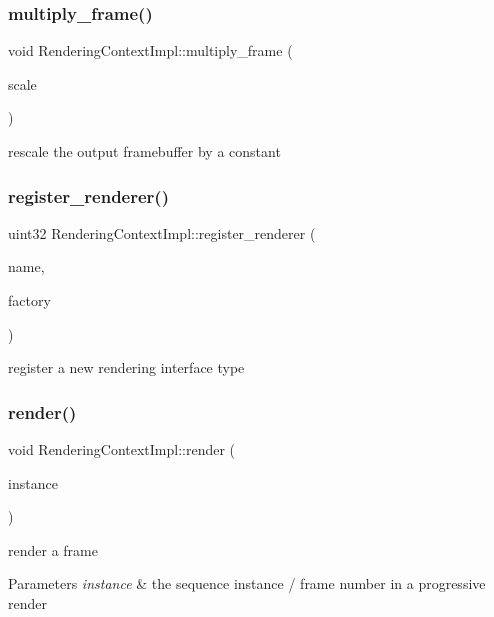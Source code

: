 \subsubsection{\texorpdfstring{multiply\+\_\+frame()}{multiply\_frame()}}
{\footnotesize\ttfamily void Rendering\+Context\+Impl\+::multiply\+\_\+frame (\begin{DoxyParamCaption}\item[{const float}]{scale }\end{DoxyParamCaption})}

rescale the output framebuffer by a constant \mbox{\label{struct_rendering_context_impl_ad709ac4ebdc451032743aef6be0f99d6}} 
\subsubsection{\texorpdfstring{register\+\_\+renderer()}{register\_renderer()}}
{\footnotesize\ttfamily uint32 Rendering\+Context\+Impl\+::register\+\_\+renderer (\begin{DoxyParamCaption}\item[{const char $\ast$}]{name,  }\item[{Renderer\+Factory\+Function}]{factory }\end{DoxyParamCaption})}

register a new rendering interface type \mbox{\label{struct_rendering_context_impl_aaf8b4f561e0beee260fbccddece3d96d}} 
\subsubsection{\texorpdfstring{render()}{render()}}
{\footnotesize\ttfamily void Rendering\+Context\+Impl\+::render (\begin{DoxyParamCaption}\item[{const uint32}]{instance }\end{DoxyParamCaption})}

render a frame


\begin{DoxyParams}{Parameters}
{\em instance} & the sequence instance / frame number in a progressive render \\
\hline
\end{DoxyParams}
\mbox{\label{struct_rendering_context_impl_a6481f4a2884fda739feecf503a7b9266}} 
